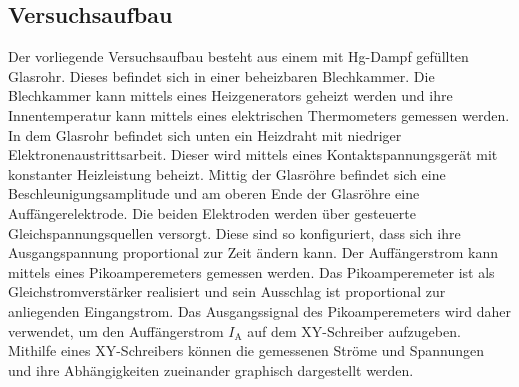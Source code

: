 \subsection{Versuchsaufbau}
\label{sec:Versuchsaufbau}
Der vorliegende Versuchsaufbau besteht aus einem mit Hg-Dampf gefüllten Glasrohr.
Dieses befindet sich in einer beheizbaren Blechkammer. Die Blechkammer kann mittels eines Heizgenerators geheizt werden und ihre Innentemperatur kann mittels eines elektrischen Thermometers gemessen werden.
In dem Glasrohr befindet sich unten ein Heizdraht mit niedriger Elektronenaustrittsarbeit. Dieser wird mittels eines Kontaktspannungsgerät mit konstanter Heizleistung beheizt. Mittig der Glasröhre befindet sich eine Beschleunigungsamplitude und am oberen Ende der Glasröhre eine Auffängerelektrode.
Die beiden Elektroden werden über gesteuerte Gleichspannungsquellen versorgt. Diese sind so konfiguriert, dass sich ihre Ausgangspannung proportional zur Zeit ändern kann.
Der Auffängerstrom kann mittels eines Pikoamperemeters gemessen werden.
Das Pikoamperemeter ist als Gleichstromverstärker realisiert und sein Ausschlag ist proportional zur anliegenden Eingangstrom. Das Ausgangssignal des Pikoamperemeters wird daher verwendet, um den Auffängerstrom $I_\mathrm{A}$ auf dem XY-Schreiber aufzugeben.
Mithilfe eines XY-Schreibers können die gemessenen Ströme und Spannungen und ihre Abhängigkeiten zueinander graphisch dargestellt werden.
